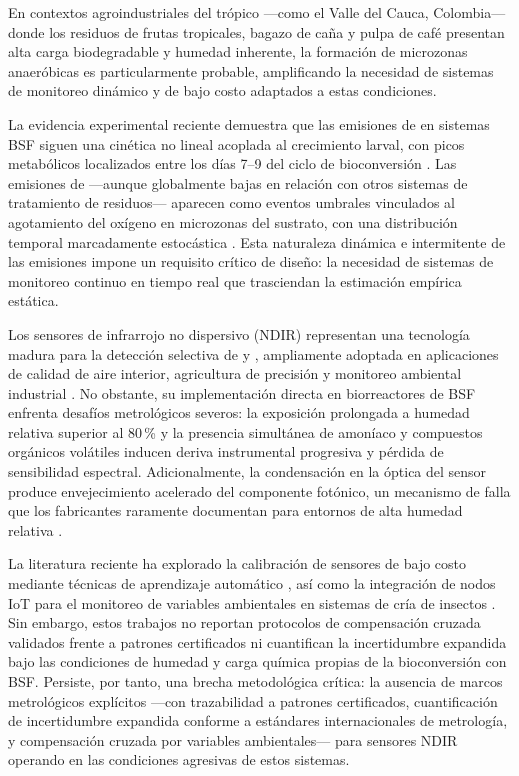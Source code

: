 En contextos agroindustriales del trópico ---como el Valle del Cauca,
Colombia--- donde los residuos de frutas tropicales, bagazo de caña y
pulpa de café presentan alta carga biodegradable y humedad inherente, la
formación de microzonas anaeróbicas es particularmente probable,
amplificando la necesidad de sistemas de monitoreo dinámico y de bajo
costo adaptados a estas condiciones.

La evidencia experimental reciente demuestra que las emisiones de
 en sistemas BSF siguen una cinética no lineal acoplada al
crecimiento larval, con picos metabólicos localizados entre los días
7--9 del ciclo de bioconversión
\autocite{rossiEstimatingDynamicsGreenhouse2024a}.
Las emisiones de  ---aunque globalmente bajas en relación con
otros sistemas de tratamiento de residuos--- aparecen como eventos
umbrales vinculados al agotamiento del oxígeno en microzonas del
sustrato, con una distribución temporal marcadamente estocástica
\autocite{bekkerImpactSubstrateMoisture2021a}.
Esta naturaleza dinámica e intermitente de las emisiones impone un
requisito crítico de diseño: la necesidad de sistemas de monitoreo
continuo en tiempo real que trasciendan la estimación empírica estática.

Los sensores de infrarrojo no dispersivo (NDIR) representan una
tecnología madura para la detección selectiva de  y ,
ampliamente adoptada en aplicaciones de calidad de aire interior,
agricultura de precisión y monitoreo ambiental industrial
\autocite{biagiDevelopmentMachineLearningbased2024a, rajRealTimeEstimation2023a}.
No obstante, su implementación directa en biorreactores de BSF enfrenta
desafíos metrológicos severos: la exposición prolongada a humedad
relativa superior al $80$\,\% y la presencia simultánea de amoníaco y
compuestos orgánicos volátiles inducen deriva instrumental progresiva y
pérdida de sensibilidad espectral.
Adicionalmente, la condensación en la óptica del sensor produce
envejecimiento acelerado del componente fotónico, un mecanismo de falla
que los fabricantes raramente documentan para entornos de alta humedad
relativa \autocite{herrinCollateralDataQualitya,
chenEffectMoistureContent2019}.

La literatura reciente ha explorado la calibración de sensores de bajo
costo mediante técnicas de aprendizaje automático
\autocite{biagiDevelopmentMachineLearningbased2024a}, así como la
integración de nodos IoT para el monitoreo de variables ambientales en
sistemas de cría de insectos
\autocite{vanIntegrationInternetofThingsSustainable2022a,
duobieneDevelopmentWirelessSensor2022}.
Sin embargo, estos trabajos no reportan protocolos de compensación
cruzada validados frente a patrones certificados ni cuantifican la
incertidumbre expandida bajo las condiciones de humedad y carga
química propias de la bioconversión con BSF.
Persiste, por tanto, una brecha metodológica crítica: la ausencia de
marcos metrológicos explícitos ---con trazabilidad a patrones
certificados, cuantificación de incertidumbre expandida conforme a
estándares internacionales de metrología, y compensación cruzada por
variables ambientales--- para sensores NDIR operando en las condiciones
agresivas de estos sistemas.

